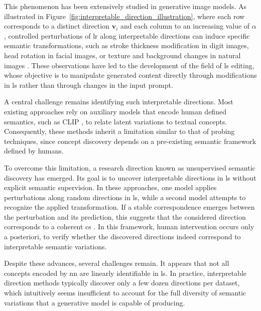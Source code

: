 This phenomenon has been extensively studied in generative image models.
As illustrated in Figure~\ref{fig:interpretable_direction_illustration}, where each row corresponds to a distinct direction $\mathbf{v}_i$ and each column to an increasing value of $\alpha$, controlled perturbations of \gls{lr} along interpretable directions can induce specific semantic transformations, such as stroke thickness modification in digit images, head rotation in facial images, or texture and background changes in natural images \cite{voynov2020unsuperviseddiscoveryinterpretabledirections}.
These observations have led to the development of the field of \gls{ls} editing, whose objective is to manipulate generated content directly through modifications in \gls{ls} rather than through changes in the input prompt.



A central challenge remains identifying such interpretable directions.
Most existing approaches rely on auxiliary models that encode human defined semantics, such as CLIP \cite{haas2024discovering}, to relate latent variations to textual concepts.
Consequently, these methods inherit a limitation similar to that of probing techniques, since concept discovery depends on a pre-existing semantic framework defined by humans.

To overcome this limitation, a research direction known as unsupervised semantic discovery has emerged.
Its goal is to uncover interpretable directions in \gls{ls} without explicit semantic supervision.
In these approaches, one model applies perturbations along random directions in \gls{ls}, while a second model attempts to recognize the applied transformation.
If a stable correspondence emerges between the perturbation and its prediction, this suggests that the considered direction corresponds to a coherent \gls{cs} \cite{voynov2020unsuperviseddiscoveryinterpretabledirections}.
In this framework, human intervention occurs only a posteriori, to verify whether the discovered directions indeed correspond to interpretable semantic variations.

Despite these advances, several challenges remain.
It appears that not all concepts encoded by \gls{nn} are linearly identifiable in \gls{ls}.
In practice, interpretable direction methods typically discover only a few dozen directions per dataset, which intuitively seems insufficient to account for the full diversity of semantic variations that a generative model is capable of producing.

